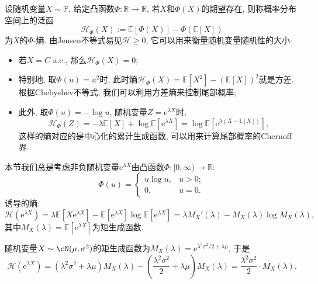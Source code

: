设随机变量$X \sim \mathbb{P}$, 给定凸函数$\Phi \colon \mathbb{R} \to \mathbb{R}$, 若$X$和$\Phi(X)$的期望存在, 则称概率分布空间上的泛函
\begin{equation*}
	\mathcal{H}_\Phi(X) := \mathbb{E}[\Phi(X)] - \Phi(\mathbb{E}[X])  
\end{equation*}
为$X$的$\Phi$-熵.
由Jensen不等式易见$\mathcal{H} \geq 0$, 它可以用来衡量随机变量随机性的大小: 
\begin{itemize}
	\item 若$X = C$ a.e., 那么$\mathcal{H}_\Phi (X) = 0$; 
	\item 特别地, 取$\Phi(u) = u^2$时, 此时熵$\mathcal{H}_\Phi(X) = \mathbb{E}[X^2] - (\mathbb{E}[X])^2$就是方差. 根据Chebyshev不等式, 我们可以利用方差熵来控制尾部概率; 
	\item 此外, 取$\Phi(u) = - \log u$, 随机变量$Z = \mathrm{e}^{\lambda X}$时, 
		\begin{equation*}
			\mathcal{H}_\Phi(Z) 
			= - \lambda \mathbb{E}[X] + \log \mathbb{E}[\mathrm{e}^{\lambda X}] 
			= \log \mathbb{E}[\mathrm{e}^{\lambda(X - \mathbb{E}[X])}], 
		\end{equation*}
		这样的熵对应的是中心化的累计生成函数, 可以用来计算尾部概率的Chernoff界. 
\end{itemize}
本节我们总是考虑非负随机变量$\mathrm{e}^{\lambda X}$由凸函数$\Phi \colon [0, \infty) \to \mathbb{R}$: 
\begin{equation*}
	\Phi(u) = 
	\begin{cases}
		u \log u, & u > 0; \\ 0, & u = 0. 
	\end{cases}
\end{equation*}
诱导的熵: 
\begin{equation}\label{eq:EntropyByMGF}
	\mathcal{H}(\mathrm{e}^{\lambda X}) 
	= \lambda \mathbb{E}[ X \mathrm{e}^{\lambda X}] - \mathbb{E}[\mathrm{e}^{\lambda X}] \log \mathbb{E}[\mathrm{e}^{\lambda X}]
	= \lambda M_X'(\lambda) - M_X(\lambda) \log M_X(\lambda), 
\end{equation}
其中$M_X(\lambda) = \mathbb{E}[\mathrm{e}^{\lambda X}]$为矩生成函数. 

\begin{example}[Gauss随机变量的熵]
	随机变量$X \sim \cN(\mu, \sigma^2)$的矩生成函数为$M_X(\lambda) = \mathrm{e}^{\lambda^2 \sigma^2 / 2 + \lambda \mu}$, 于是
	\begin{equation}\label{eq:EntropyOfGaussianRV}
		\mathcal{H}(\mathrm{e}^{\lambda X}) 
		= (\lambda^2 \sigma^2 + \lambda \mu) M_X(\lambda) - \left(\frac{\lambda^2 \sigma^2}{2} + \lambda\mu\right) M_X(\lambda) 
		= \frac{\lambda^2 \sigma^2}{2} \cdot M_X(\lambda). 
	\end{equation}
\end{example}

